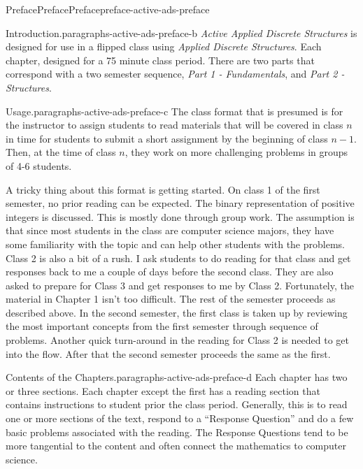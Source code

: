 \documentclass[oneside,10pt,]{book}
\numberwithin{equation}{section}
\begin{document}
\begin{preface}{Preface}{Preface}{}{Preface}{}{}{preface-active-ads-preface}
\begin{paragraphs}{Introduction.}{paragraphs-active-ads-preface-b}%
\emph{Active Applied Discrete Structures} is designed for use in a flipped class using \emph{Applied Discrete Structures}. Each chapter, designed for a 75 minute class period.  There are two parts that correspond with a two semester sequence, \emph{Part 1 - Fundamentals}, and \emph{Part 2 - Structures}.%
\end{paragraphs}%
\begin{paragraphs}{Usage.}{paragraphs-active-ads-preface-c}%
The class format that is presumed is for the instructor to assign students to read materials that will be covered in class \(n\) in time for students to submit a short assignment by the beginning of class \(n-1\). Then, at the time of class \(n\), they work on more challenging problems in groups of 4-6 students.%
\par
A tricky thing about this format is getting started. On class 1 of the first semester, no prior reading can be expected. The binary representation of positive integers is discussed. This is mostly done through group work. The assumption is that since most students in the class are computer science majors, they have some familiarity with the topic and can help  other students with the problems. Class 2 is also a bit of a rush. I ask students to do reading for that class and get responses back to me a couple of days before the second class. They are also asked to prepare for Class 3 and get responses to me by Class 2.   Fortunately, the material in Chapter 1 isn't too difficult.  The rest of the semester proceeds as described above. In the second semester, the first class is taken up by reviewing the most important concepts from the first semester through sequence of problems. Another quick turn-around in the reading for Class 2 is needed to get into the flow.  After that the second semester proceeds the same as the first.%
\end{paragraphs}%
\begin{paragraphs}{Contents of the Chapters.}{paragraphs-active-ads-preface-d}%
Each chapter has two or three sections.  Each chapter except the first has a reading section that contains instructions to student prior the class period. Generally, this is to read one or more sections of the text, respond to a ``Response Question'' and do a few basic problems associated with the reading.  The Response Questions tend to be more tangential to the content and often connect the mathematics to computer science.%

\end{paragraphs}
\end{preface}
\end{document}
